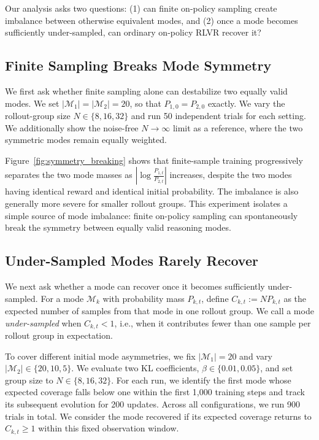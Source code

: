 \documentclass[11pt]{article}
\begin{document}
Our analysis asks two questions:
(1) can finite on-policy sampling create imbalance between otherwise equivalent modes, and
(2) once a mode becomes sufficiently under-sampled, can ordinary on-policy RLVR recover it?


\subsection{Finite Sampling Breaks Mode Symmetry}
\label{sec:symmetry_breaking}

We first ask whether finite sampling alone can destabilize two equally valid modes.
We set $|\mathcal{M}_1|=|\mathcal{M}_2|=20$, so that $P_{1,0}=P_{2,0}$ exactly. We vary the rollout-group size $N\in\{8,16,32\}$ and run 50 independent trials for each setting. 
We additionally show the noise-free $N\to\infty$ limit as a reference, where the two symmetric modes remain equally weighted.

Figure~\ref{fig:symmetry_breaking} shows that finite-sample training progressively separates the two mode masses as $|\log\frac{P_{1,t}}{P_{2,t}}|$ increases, despite the two modes having identical reward and identical initial probability.
The imbalance is also generally more severe for smaller rollout groups.
This experiment isolates a simple source of mode imbalance: finite on-policy sampling can spontaneously break the symmetry between equally valid reasoning modes.

\subsection{Under-Sampled Modes Rarely Recover}
\label{sec:mode_recovery}

We next ask whether a mode can recover once it becomes sufficiently under-sampled.
For a mode $\mathcal{M}_k$ with probability mass $P_{k,t}$, define $C_{k,t}:=NP_{k,t}$ as the expected number of samples from that mode in one rollout group.
We call a mode \emph{under-sampled} when $C_{k,t}<1$, i.e., when it contributes fewer than one sample per rollout group in expectation.

To cover different initial mode asymmetries, we fix $|\mathcal{M}_1|=20$ and vary $|\mathcal{M}_2|\in\{20,10,5\}$. We evaluate two KL coefficients, $\beta\in\{0.01,0.05\}$, and set group size to $N\in\{8,16,32\}$.
For each run, we identify the first mode whose expected coverage falls below one within the first 1,000 training steps and track its subsequent evolution for 200 updates.
Across all configurations, we run 900 trials in total.
We consider the mode recovered if its expected coverage returns to $C_{k,t}\geq 1$ within this fixed observation window.
\end{document}
